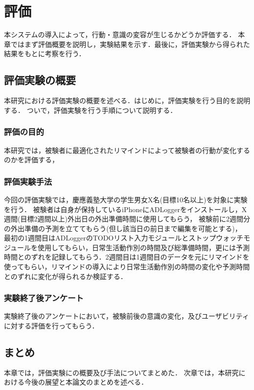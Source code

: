 \chapter{評価}
本システムの導入によって，行動・意識の変容が生じるかどうか評価する．
本章ではまず評価概要を説明し，実験結果を示す．最後に，評価実験から得られた結果をもとに考察を行う．

\section{評価実験の概要}
本研究における評価実験の概要を述べる．はじめに，評価実験を行う目的を説明する．
ついで，評価実験を行う手順について説明する．

\subsection{評価の目的}
本研究では，被験者に最適化されたリマインドによって被験者の行動が変化するのかを評価する，

\subsection{評価実験手法}
今回の評価実験では，慶應義塾大学の学生男女X名(目標10名以上)を対象に実験を行う．
被験者は自身が保持しているiPhoneにADLoggerをインストールし，X週間(目標2週間以上)外出日の外出準備時間に使用してもらう，
被験前に2週間分の外出準備の予測を立ててもらう(但し該当日の前日まで編集を可能とする)，
最初の1週間目はADLoggerのTODOリスト入力モジュールとストップウォッチモジュールを使用してもらい，日常生活動作別の時間及び総準備時間，更には予測時間とのずれを記録してもらう．2週間目は1週間目のデータを元にリマインドを使ってもらい，リマインドの導入により日常生活動作別の時間の変化や予測時間とのずれに変化が得られるか検証する．

\subsection{実験終了後アンケート}
実験終了後のアンケートにおいて，被験前後の意識の変化，及びユーザビリティに対する評価を行ってもらう．

\section{まとめ}
本章では，評価実験にの概要及び手法についてまとめた．
次章では，本研究における今後の展望と本論文のまとめを述べる．
